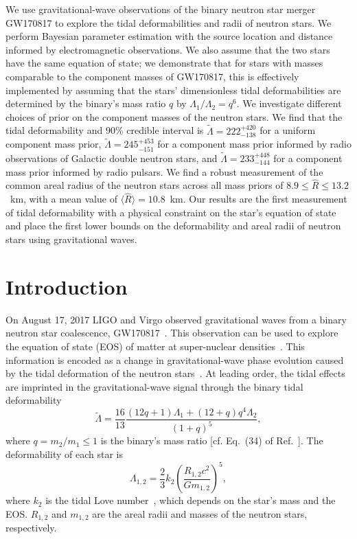 We use gravitational-wave observations of the binary neutron star merger GW170817 to explore the tidal deformabilities and radii of neutron stars. We perform Bayesian parameter estimation with the source location and distance informed by electromagnetic observations. We also assume that the two stars have the same equation of state; we demonstrate that for stars with masses comparable to the component masses of GW170817, this is effectively implemented by assuming that the stars' dimensionless tidal deformabilities are determined by the binary's mass ratio $q$ by $\Lambda_1/\Lambda_2 = q^6$. We investigate different choices of prior on the component masses of the neutron stars. We find that the tidal deformability and 90\% credible interval is $\tilde{\Lambda}=222^{+420}_{-138}$ for a uniform component mass prior, $\tilde{\Lambda}=245^{+453}_{-151}$ for a component mass prior informed by radio observations of Galactic double neutron stars, and $\tilde{\Lambda}=233^{+448}_{-144}$ for a component mass prior informed by radio pulsars. We find a robust measurement of the common areal radius of the neutron stars across all mass priors of $8.9 \le \hat{R} \le 13.2$~km, with a mean value of $\langle \hat{R} \rangle = 10.8$~km. Our results are the first measurement of tidal deformability with a physical constraint on the star's equation of state and place the first lower bounds on the deformability and areal radii of neutron stars using gravitational waves.

\section{Introduction}
On August 17, 2017 LIGO and Virgo observed gravitational waves from a binary neutron star coalescence, GW170817~\cite{TheLIGOScientific:2017qsa}.
This observation can be used to explore the equation of state (EOS) of matter at super-nuclear densities~\cite{thorne.k:1987,Read:2009yp}. This information is encoded as a change in gravitational-wave phase evolution caused by the tidal deformation of the  neutron stars~\cite{Flanagan:2007ix}. 
At leading order, the tidal effects are imprinted in the gravitational-wave signal through the binary tidal deformability~\cite{Flanagan:2007ix,Hinderer:2007mb}
\begin{equation}
\tilde{\Lambda}
= \frac{16}{13}\frac{(12q+1)\Lambda_1+(12+q)q^4\Lambda_2}{(1+q)^5}, \label{eq:common_rad_lambda_t0}
\end{equation}
where $q = m_2/m_1 \leq 1$ is the binary's mass ratio [cf. Eq.~(34) of Ref.~\cite{Gralla:2017djj}]. The deformability of each star is
\begin{equation}
\Lambda_{1,2}=\frac{2}{3}k_2\left(\frac{R_{1,2}c^2}{Gm_{1,2}}\right)^5, \label{eq:lambda_12}
\end{equation}
where $k_2$ is the tidal Love number~\cite{Flanagan:2007ix,Hinderer:2007mb}, which depends on the star's mass and the EOS. $R_{1,2}$ and $m_{1,2}$ are the areal radii and masses of the neutron stars, respectively. 

